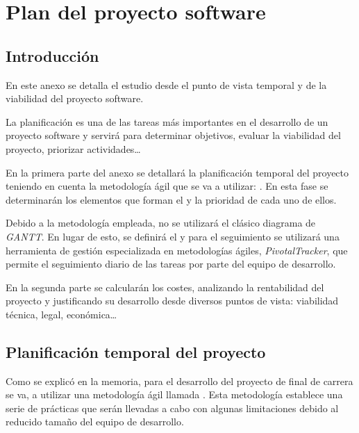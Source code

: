 \chapter{Plan del proyecto software}

\section{Introducción}
En este anexo se detalla el estudio desde el punto de vista temporal y de la viabilidad del proyecto software.

La planificación es una de las tareas más importantes en el desarrollo de un proyecto software y servirá para determinar objetivos, evaluar la viabilidad del proyecto, priorizar actividades\dots

En la primera parte del anexo se detallará la planificación temporal del proyecto teniendo en cuenta la metodología ágil que se va a utilizar: \scrum{}. En esta fase se determinarán los elementos que forman el \productbacklog{} y la prioridad de cada uno de ellos.

Debido a la metodología empleada, no se utilizará el clásico diagrama de \textit{GANTT}. En lugar de esto, se definirá el \productbacklog{} y para el seguimiento se utilizará una herramienta de gestión especializada en metodologías ágiles, \textit{PivotalTracker}, que permite el seguimiento diario de las tareas por parte del equipo de desarrollo.

En la segunda parte se calcularán los costes, analizando la rentabilidad del proyecto y justificando su desarrollo desde diversos puntos de vista: viabilidad técnica, legal, económica\dots
\newpage



\section{Planificación temporal del proyecto} 
Como se explicó en la memoria, para el desarrollo del proyecto de final de carrera se va, a utilizar una metodología ágil llamada \scrum{}. Esta metodología establece una serie de prácticas que serán llevadas a cabo con algunas limitaciones debido al reducido tamaño del equipo de desarrollo.

